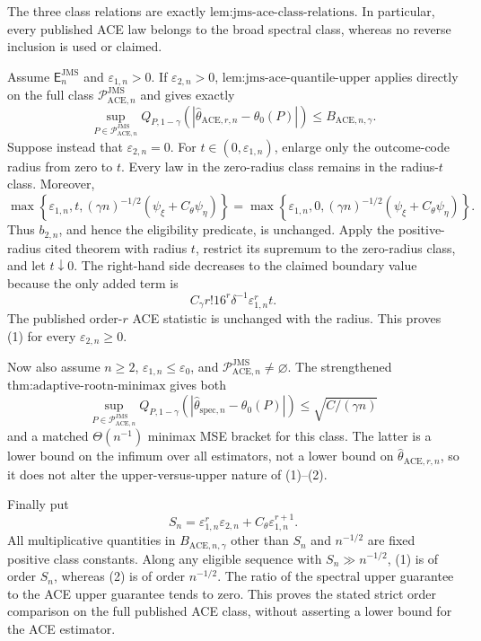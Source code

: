 The three class relations are exactly \(\text{lem:jms-ace-class-relations}\). In particular, every published ACE law belongs to the broad spectral class, whereas no reverse inclusion is used or claimed.

Assume \(\mathsf E_n^{\mathrm{JMS}}\) and \(\varepsilon_{1,n}>0\). If \(\varepsilon_{2,n}>0\), \(\text{lem:jms-ace-quantile-upper}\) applies directly on the full class \(\mathcal P_{\mathrm{ACE},n}^{\mathrm{JMS}}\) and gives exactly
\[
 \sup_{P\in\mathcal P_{\mathrm{ACE},n}^{\mathrm{JMS}}}
 Q_{P,1-\gamma}(|\widehat\theta_{\mathrm{ACE},r,n}-\theta_0(P)|)
 \le B_{\mathrm{ACE},n,\gamma}.
 \tag{1}
\]
Suppose instead that \(\varepsilon_{2,n}=0\). For \(t\in(0,\varepsilon_{1,n})\), enlarge only the outcome-code radius from zero to \(t\). Every law in the zero-radius class remains in the radius-\(t\) class. Moreover,
\[
 \max\!\left\{\varepsilon_{1,n},t,
 (\gamma n)^{-1/2}(\psi_{\xi}+C_{\theta}\psi_{\eta})\right\}
 =
 \max\!\left\{\varepsilon_{1,n},0,
 (\gamma n)^{-1/2}(\psi_{\xi}+C_{\theta}\psi_{\eta})\right\}.
\]
Thus \(b_{2,n}\), and hence the eligibility predicate, is unchanged. Apply the positive-radius cited theorem with radius \(t\), restrict its supremum to the zero-radius class, and let \(t\downarrow0\). The right-hand side decreases to the claimed boundary value because the only added term is
\[
 C_{\gamma}r!16^r\delta^{-1}\varepsilon_{1,n}^rt.
\]
The published order-\(r\) ACE statistic is unchanged with the radius. This proves (1) for every \(\varepsilon_{2,n}\ge0\).

Now also assume \(n\ge2\), \(\varepsilon_{1,n}\le\varepsilon_0\), and \(\mathcal P_{\mathrm{ACE},n}^{\mathrm{JMS}}\neq\varnothing\). The strengthened \(\text{thm:adaptive-rootn-minimax}\) gives both
\[
 \sup_{P\in\mathcal P_{\mathrm{ACE},n}^{\mathrm{JMS}}}
 Q_{P,1-\gamma}(|\widehat\theta_{\mathrm{spec},n}-\theta_0(P)|)
 \le\sqrt{C/(\gamma n)}
 \tag{2}
\]
and a matched \(\Theta(n^{-1})\) minimax MSE bracket for this class. The latter is a lower bound on the infimum over all estimators, not a lower bound on \(\widehat\theta_{\mathrm{ACE},r,n}\), so it does not alter the upper-versus-upper nature of (1)--(2).

Finally put
\[
 S_n=\varepsilon_{1,n}^r\varepsilon_{2,n}
     +C_{\theta}\varepsilon_{1,n}^{r+1}.
\]
All multiplicative quantities in \(B_{\mathrm{ACE},n,\gamma}\) other than \(S_n\) and \(n^{-1/2}\) are fixed positive class constants. Along any eligible sequence with \(S_n\gg n^{-1/2}\), (1) is of order \(S_n\), whereas (2) is of order \(n^{-1/2}\). The ratio of the spectral upper guarantee to the ACE upper guarantee tends to zero. This proves the stated strict order comparison on the full published ACE class, without asserting a lower bound for the ACE estimator.